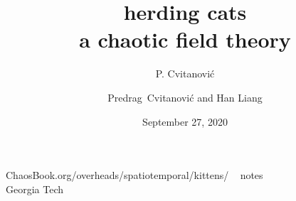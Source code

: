 
                        \newif\ifboyscout\boyscouttrue          %
                        \newif\ifsubmission\submissionfalse     %
                        \newif\ifblog\blogfalse %


\usepackage[font=scriptsize, labelfont=bf]{caption}
\usepackage[
    backend=biber,  %
    sorting=nyt,
    style=numeric, %
    natbib=true,
    style=phys, %
    biblabel= brackets, %
    articletitle=false, %
    pageranges = true , %
    sortlocale=en_US,
    firstinits=true,
    url=false, %
    doi=false, %
    eprint=false
]{biblatex}



\renewcommand{\Ssym}[1]{{\ensuremath{m_{#1}}}}    %


\title{
{\huge herding cats} %
    \\
{a chaotic field theory}
}
\author{P. Cvitanovi\'c}
\author[Cvitanovi\'c]
{
  \textcolor{green!50!black}{
  {Predrag~Cvitanovi\'c
   and
   Han Liang
  }	%
  }
}
\institute
{
 ChaosBook.org/overheads/spatiotemporal/kittens/   ~ notes
 \\
               Georgia Tech
 }
\date{September 27, 2020}

\begin{frame}
  \titlepage
\end{frame} %


